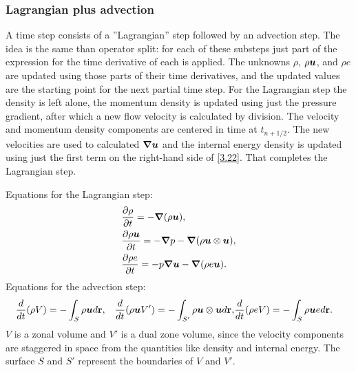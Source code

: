 \subsubsection{Lagrangian plus advection}
A time step consists of a ''Lagrangian'' step followed by an advection step.
The idea is the same than operator split: for each of these substeps just part
of the expression for the time derivative of each  is applied. The unknowns
$\rho$, $\rho\boldsymbol{u}$, and $\rho e$ are updated using those parts of their time
derivatives, and the updated values are the starting point for the next
partial time step. For the Lagrangian step the density is left alone, the
momentum density is updated using just the pressure gradient, after which a
new flow velocity is calculated by division. The velocity and momentum density
components are centered in time at $t_{n+1/2}$. The new velocities are used to
calculated $\boldsymbol{\nabla}\boldsymbol{u}$ and the internal energy density is updated using just
the first term on the right-hand side of \cref{3.22}. That completes the
Lagrangian step.

Equations for the Lagrangian step:
\begin{align}
  &\frac{\partial \rho}{\partial t} = -\boldsymbol{\nabla} (\rho \boldsymbol{u}),\\
  &\frac{\partial \rho \boldsymbol{u}}{\partial t} = -\boldsymbol{\nabla} p - \boldsymbol{\nabla}(\rho
  \boldsymbol{u}\otimes\boldsymbol{u}),\\
  &\frac{\partial \rho e}{\partial t} = -p\boldsymbol{\nabla}\boldsymbol{u} - \boldsymbol{\nabla} (\rho e \boldsymbol{u})
  \label{3.22}.
\end{align}
Equations for the advection step:
\begin{align}
  &\frac{d}{dt}(\rho V) = -\int_S \rho \boldsymbol{u}d\mathbf{r},
  &\frac{d}{dt}(\rho \boldsymbol{u}V') = -\int_{S'} \rho \boldsymbol{u}\otimes\boldsymbol{u} d\mathbf{r},
  &\frac{d}{dt}(\rho e V) = -\int_S \rho \boldsymbol{u}e d\mathbf{r}.
\end{align}
$V$ is a zonal volume and $V'$ is a dual zone volume, since the velocity
components are staggered in space from the quantities like density and
internal energy. The surface $S$ and $S'$ represent the boundaries of $V$ and
$V'$.
